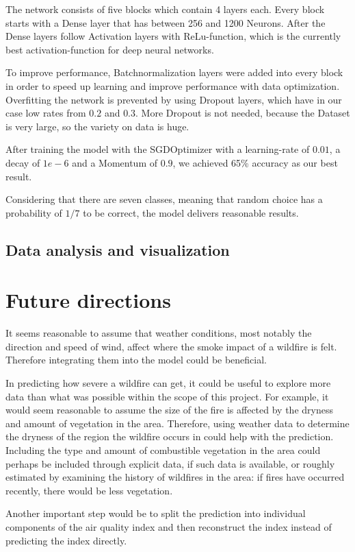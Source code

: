 \documentclass[a4paper,12pt]{article}
\begin{document}
The network consists of five blocks which contain 4 layers each. Every block starts with a Dense layer that has between 256 and 1200 Neurons. After the Dense layers follow Activation layers with ReLu-function, which is the currently best activation-function for deep neural networks.

To improve performance, Batchnormalization layers were added into every block in order to speed up learning and improve performance with data optimization. Overfitting the network is prevented by using Dropout layers, which have in our case low rates from $0.2$ and $0.3$. More Dropout is not needed, because the Dataset is very large, so the variety on data is huge.

After training the model with the SGDOptimizer with a learning-rate of $0.01$, a decay of $1e-6$ and a Momentum of $0.9$, we achieved 65\% accuracy as our best result.

Considering that there are seven classes, meaning that random choice has a probability of $1/7$ to be correct, the model delivers reasonable results.

\subsection{Data analysis and visualization}

\section{Future directions}

It seems reasonable to assume that weather conditions, most notably the direction and speed of wind, affect where the smoke impact of a wildfire is felt. Therefore integrating them into the model could be beneficial.

In predicting how severe a wildfire can get, it could be useful to explore more data than what was possible within the scope of this project. For example, it would seem reasonable to assume the size of the fire is affected by the dryness and amount of vegetation in the area. Therefore, using weather data to determine the dryness of the region the wildfire occurs in could help with the prediction. Including the type and amount of combustible vegetation in the area could perhaps be included through explicit data, if such data is available, or roughly estimated by examining the history of wildfires in the area: if fires have occurred recently, there would be less vegetation.

Another important step would be to split the prediction into individual components of the air quality index and then reconstruct the index instead of predicting the index directly.
\end{document}

